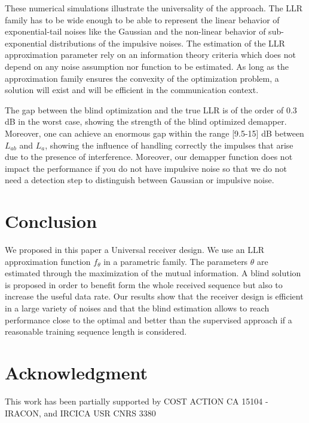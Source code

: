 \documentclass[a4paper]{IEEEtran}
\begin{document}
These numerical simulations illustrate the universality of
the approach. The LLR family has to be wide enough to be
able to represent the linear behavior of exponential-tail
noises like the Gaussian and the non-linear behavior of
sub-exponential distributions of the impulsive noises. The
estimation of the LLR approximation parameter rely on an
information theory criteria which does not depend on any
noise assumption nor function to be estimated. As long as
the approximation family ensures the convexity of the
optimization problem, a solution will exist and will be
efficient in the communication context.

The gap between the blind optimization and the true LLR is
of the order of 0.3 dB in the worst case, showing the
strength of the blind optimized demapper. Moreover, one can
achieve an enormous gap within the range [9.5-15] dB between
$L_{ab}$ and $L_a$, showing the influence of handling
correctly the impulses that arise due to the presence of
interference. Moreover, our demapper function does not
impact the performance if you do not have impulsive noise so
that we do not need a detection step to distinguish between
Gaussian or impulsive noise.





\section{Conclusion}
\label{section:conclu}

We proposed in this paper a Universal receiver design. We
use an LLR approximation function $f_\theta$ in a parametric
family. The parameters $\theta$ are estimated through the
maximization of the mutual information. A blind solution is
proposed in order to benefit form the whole received
sequence but also to increase the useful data rate. Our
results show that the receiver design is efficient in
a large variety of noises and that the blind estimation
allows to reach performance close to the optimal and better
than the supervised approach if a reasonable training
sequence length is considered.




\section*{Acknowledgment}
\label{section:Ack}

This work has been partially supported by COST ACTION CA
15104 - IRACON, and IRCICA USR CNRS 3380





\end{document}
